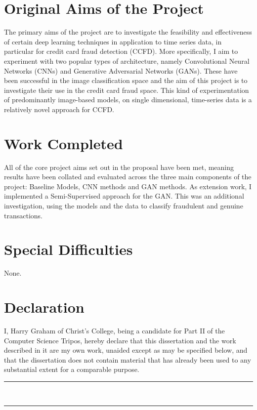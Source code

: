 \documentclass[12pt,a4paper,twoside]{report}
\begin{document}
\section*{Original Aims of the Project}
The primary aims of the project are to investigate the feasibility and effectiveness of certain deep learning techniques in application to time series data, in particular for credit card fraud detection (CCFD). More specifically, I aim to experiment with two popular types of architecture, namely Convolutional Neural Networks (CNNs)  \cite{DBLP:journals/corr/SimonyanZ14a} and Generative Adversarial Networks (GANs)\cite{2014arXiv1406.2661G}. These have been successful in the image classification space and the aim of this project is to investigate their use in the credit card fraud space. This kind of experimentation of predominantly image-based models, on single dimensional, time-series data is a relatively novel approach for CCFD.

\section*{Work Completed}
All of the core project aims set out in the proposal have been met, meaning results have been collated and evaluated across the three main components of the project: Baseline Models, CNN methods and GAN methods. 
As extension work, I implemented a Semi-Supervised approach for the GAN. This was an additional investigation, using the models and the data to classify fraudulent and genuine transactions.

\section*{Special Difficulties}
None.


\newpage

\section*{Declaration}

I, Harry Graham of Christ's College, being a candidate for Part II of the Computer Science Tripos, hereby declare that this dissertation and the work described in it are my own work, unaided except as may be specified below, and that the dissertation does not contain material that has already been used to any substantial extent for a comparable purpose.

\vspace{1cm}
\begin{multicols}{2}

\rule{5cm}{0.15mm} \\

\columnbreak

\rule{5cm}{0.15mm} \\

\end{multicols}
\end{document}
